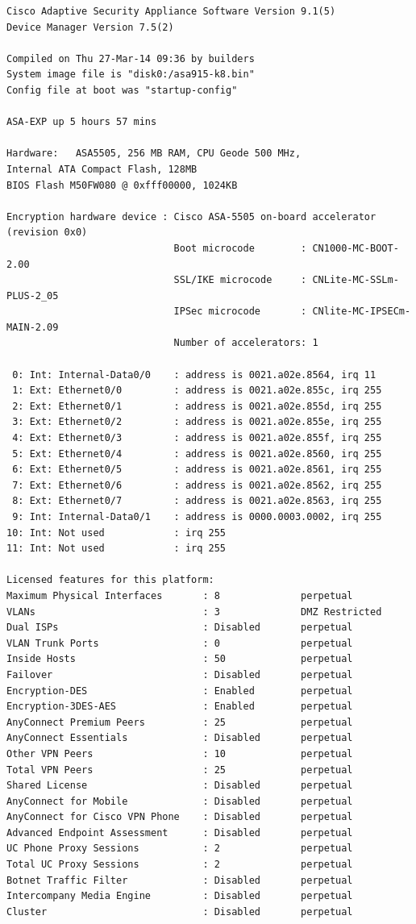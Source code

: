 \documentclass[12pt]{article}
\begin{document}
\begin{lstlisting}[style=python,basicstyle=\ttfamily\scriptsize]
 Cisco Adaptive Security Appliance Software Version 9.1(5) 
Device Manager Version 7.5(2)

Compiled on Thu 27-Mar-14 09:36 by builders
System image file is "disk0:/asa915-k8.bin"
Config file at boot was "startup-config"

ASA-EXP up 5 hours 57 mins

Hardware:   ASA5505, 256 MB RAM, CPU Geode 500 MHz,
Internal ATA Compact Flash, 128MB
BIOS Flash M50FW080 @ 0xfff00000, 1024KB

Encryption hardware device : Cisco ASA-5505 on-board accelerator (revision 0x0)
                             Boot microcode        : CN1000-MC-BOOT-2.00 
                             SSL/IKE microcode     : CNLite-MC-SSLm-PLUS-2_05
                             IPSec microcode       : CNlite-MC-IPSECm-MAIN-2.09
                             Number of accelerators: 1

 0: Int: Internal-Data0/0    : address is 0021.a02e.8564, irq 11
 1: Ext: Ethernet0/0         : address is 0021.a02e.855c, irq 255
 2: Ext: Ethernet0/1         : address is 0021.a02e.855d, irq 255
 3: Ext: Ethernet0/2         : address is 0021.a02e.855e, irq 255
 4: Ext: Ethernet0/3         : address is 0021.a02e.855f, irq 255
 5: Ext: Ethernet0/4         : address is 0021.a02e.8560, irq 255
 6: Ext: Ethernet0/5         : address is 0021.a02e.8561, irq 255
 7: Ext: Ethernet0/6         : address is 0021.a02e.8562, irq 255
 8: Ext: Ethernet0/7         : address is 0021.a02e.8563, irq 255
 9: Int: Internal-Data0/1    : address is 0000.0003.0002, irq 255
10: Int: Not used            : irq 255
11: Int: Not used            : irq 255

Licensed features for this platform:
Maximum Physical Interfaces       : 8              perpetual
VLANs                             : 3              DMZ Restricted
Dual ISPs                         : Disabled       perpetual
VLAN Trunk Ports                  : 0              perpetual
Inside Hosts                      : 50             perpetual
Failover                          : Disabled       perpetual
Encryption-DES                    : Enabled        perpetual
Encryption-3DES-AES               : Enabled        perpetual
AnyConnect Premium Peers          : 25             perpetual
AnyConnect Essentials             : Disabled       perpetual
Other VPN Peers                   : 10             perpetual
Total VPN Peers                   : 25             perpetual
Shared License                    : Disabled       perpetual
AnyConnect for Mobile             : Disabled       perpetual
AnyConnect for Cisco VPN Phone    : Disabled       perpetual
Advanced Endpoint Assessment      : Disabled       perpetual
UC Phone Proxy Sessions           : 2              perpetual
Total UC Proxy Sessions           : 2              perpetual
Botnet Traffic Filter             : Disabled       perpetual
Intercompany Media Engine         : Disabled       perpetual
Cluster                           : Disabled       perpetual


\end{lstlisting}
\end{document}
